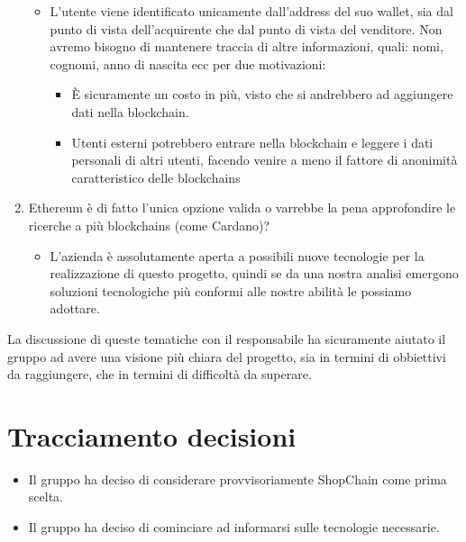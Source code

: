 \begin{enumerate}
            \begin{itemize}
                \item L'utente viene identificato unicamente dall'address del suo wallet, sia dal punto di vista dell'acquirente che dal punto di vista del venditore. Non avremo bisogno di
                      mantenere traccia di altre informazioni, quali: nomi, cognomi, anno di nascita ecc per due motivazioni:
                      \begin{itemize}
                          \item È sicuramente un costo in più, visto che si andrebbero ad aggiungere dati nella blockchain.
                          \item Utenti esterni potrebbero entrare nella blockchain e leggere i dati personali di altri utenti, facendo venire a meno il fattore di anonimità caratteristico delle blockchains
                      \end{itemize}
            \end{itemize}
    \item Ethereum è di fatto l'unica opzione valida o varrebbe la pena approfondire le ricerche a più blockchains (come Cardano)?
            \begin{itemize}
                \item L'azienda è assolutamente aperta a possibili nuove tecnologie per la realizzazione di questo progetto, quindi se da una nostra analisi emergono soluzioni tecnologiche più conformi alle nostre abilità le possiamo adottare.
            \end{itemize}
\end{enumerate}
La discussione di queste tematiche con il responsabile ha sicuramente aiutato il gruppo ad avere una visione più chiara del progetto,
sia in termini di obbiettivi da raggiungere, che in termini di difficoltà da superare.
\section{Tracciamento decisioni}
\begin{itemize}
    \item Il gruppo ha deciso di considerare provvisoriamente ShopChain come prima scelta.
    \item Il gruppo ha deciso di cominciare ad informarsi sulle tecnologie necessarie.
\end{itemize}